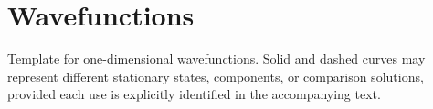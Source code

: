 \section*{Wavefunctions}

\begin{bookfigure}{Template for one-dimensional wavefunctions. Solid and dashed
curves may represent different stationary states, components, or comparison
solutions, provided each use is explicitly identified in the accompanying text.}
\wavefunctionplot
\end{bookfigure}
